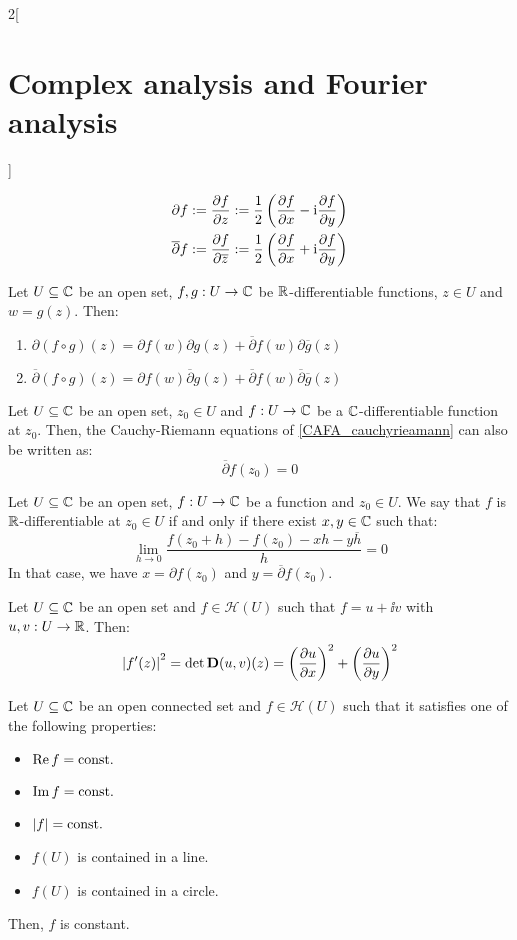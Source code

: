 \documentclass[../../../main.tex]{subfiles}
\begin{document}
\begin{multicols}{2}[\section{Complex analysis and Fourier analysis}]
\begin{definition}
    \begin{align*}
      \partial f:=\pdv{f}{z}                       & :=\frac{1}{2}\left(\pdv{f}{x}-\mathrm{i}\pdv{f}{y}\right) \\
      \overline{\partial} f:=\pdv{f}{\overline{z}} & :=\frac{1}{2}\left(\pdv{f}{x}+\mathrm{i}\pdv{f}{y}\right)
    \end{align*}
  \end{definition}
  \begin{proposition}
    Let $U\subseteq \mathbb{C}$ be an open set, $f,g:U\rightarrow \mathbb{C}$ be $\mathbb{R}$-differentiable functions, $z\in U$ and $w=g(z)$. Then:
    \begin{enumerate}
      \item $\partial(f\circ g)(z)=\partial f(w)\partial g(z)+\overline{\partial}f(w)\partial \overline{g}(z)$
      \item $\overline{\partial}(f\circ g)(z)=\partial f(w)\overline{\partial} g(z)+\overline{\partial}f(w)\overline{\partial} \overline{g}(z)$
    \end{enumerate}
  \end{proposition}
  \begin{proposition}
    Let $U\subseteq \mathbb{C}$ be an open set, $z_0\in U$ and $f:U\rightarrow \mathbb{C}$ be a $\mathbb{C}$-differentiable function at $z_0$. Then, the Cauchy-Riemann equations of \cref{CAFA_cauchyrieamann} can also be written as: $$\overline{\partial} f(z_0)=0$$
  \end{proposition}
  \begin{proposition}
    Let $U\subseteq \mathbb{C}$ be an open set, $f:U\rightarrow \mathbb{C}$ be a function and $z_0\in U$. We say that $f$ is $\mathbb{R}$-differentiable at $z_0\in U$ if and only if there exist $x,y\in \mathbb{C}$ such that: $$\lim_{h\to 0}\frac{f(z_0+h)-f(z_0)-xh-y\overline{h}}{h}=0$$
    In that case, we have $x=\partial f(z_0)$ and $y=\overline{\partial} f(z_0)$.
  \end{proposition}
  \begin{proposition}
    Let $U\subseteq \mathbb{C}$ be an open set and $f\in\mathcal{H}(U)$ such that $f=u+\ii v$ with $u,v:U\rightarrow\mathbb{R}$. Then:
    $${|f'(z)|}^2=\det \boldsymbol{\mathrm{D}}(u,v)(z)={\left(\pdv{u}{x}\right)}^2+{\left(\pdv{u}{y}\right)}^2$$
  \end{proposition}
  \begin{proposition}
    Let $U\subseteq \mathbb{C}$ be an open connected set and $f\in\mathcal{H}(U)$ such that it satisfies one of the following properties:
    \begin{itemize}
      \item $\Re f=\text{const.}$
      \item $\Im f=\text{const.}$
      \item $\abs{f}=\text{const.}$
      \item $f(U)$ is contained in a line.
      \item $f(U)$ is contained in a circle.
    \end{itemize}
    Then, $f$ is constant.
  \end{proposition}

\end{multicols}
\end{document}
